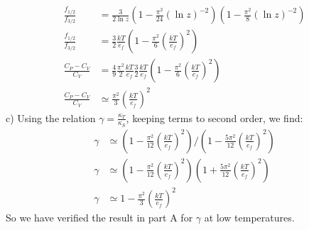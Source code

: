 \documentclass[a4paper,11pt]{article}
\numberwithin{equation}{section}
\begin{document}
\begin{align}
 \frac{f_{1/2}}{f_{3/2}} &= \frac{3}{2\ln{z}}\left(1-\frac{\pi^2}{24}(\ln{z})^{-2}\right)\left(1-\frac{\pi^2}{8}(\ln{z})^{-2} \right)\\
 \frac{f_{1/2}}{f_{3/2}} &= \frac{3}{2}\frac{kT}{e_f}\left(1-\frac{\pi^2}{6}(\frac{kT}{e_f})^{2}\right)\\
 \frac{C_P-C_V}{C_V} &=\frac{4}{9}\frac{\pi^2}{2}\frac{kT}{e_f}\frac{3}{2}\frac{kT}{e_f}\left(1-\frac{\pi^2}{6}(\frac{kT}{e_f})^{2}\right)\\
 \frac{C_P-C_V}{C_V} &\simeq \frac{\pi^2}{3}\left(\frac{kT}{e_f} \right)^2
\end{align}
c) Using the relation $\gamma = \frac{\kappa_T}{\kappa_S}$, keeping terms to second order, we find:
\begin{align}
 \gamma &\simeq \left(1-\frac{\pi^2}{12}(\frac{kT}{e_f})^{2}\right)/\left(1-\frac{5\pi^2}{12}(\frac{kT}{e_f})^{2}\right)\\
 \gamma &\simeq \left(1-\frac{\pi^2}{12}(\frac{kT}{e_f})^{2}\right)\left(1+\frac{5\pi^2}{12}(\frac{kT}{e_f})^{2}\right)\\
 \gamma &\simeq 1-\frac{\pi^2}{3}(\frac{kT}{e_f})^2
\end{align}
So we have verified the result in part A for $\gamma$ at low temperatures.
\end{document}
